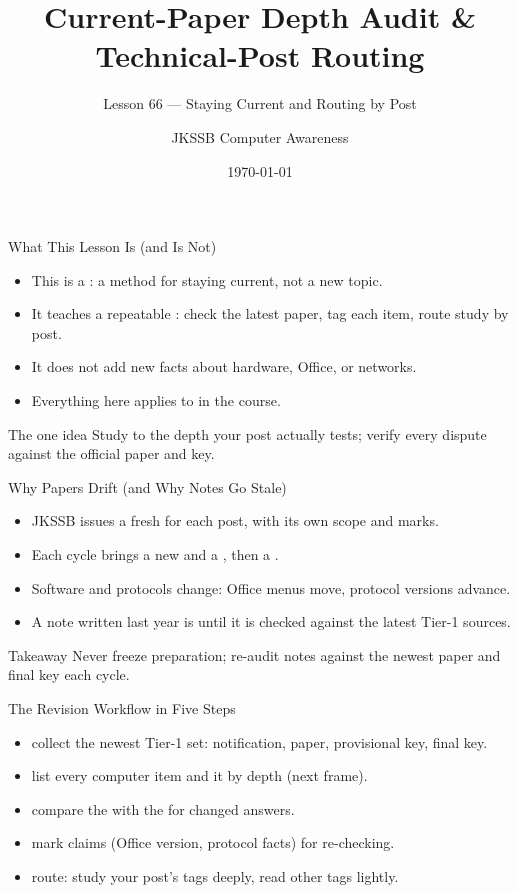 \documentclass[aspectratio=169]{beamer}
\title{Current-Paper Depth Audit \& Technical-Post Routing}
\subtitle{Lesson 66 --- Staying Current and Routing by Post}
\author{JKSSB Computer Awareness}
\date{\today}
\begin{document}
\frame{\titlepage}

\begin{frame}{What This Lesson Is (and Is Not)}
  \begin{itemize}
    \item This is a : a method for staying current, not a new topic.
    \item It teaches a repeatable : check the latest paper, tag each item, route study by post.
    \item It does not add new facts about hardware, Office, or networks.
    \item Everything here applies to  in the course.
  \end{itemize}
  \begin{block}{The one idea}
    Study to the depth your post actually tests; verify every dispute against the official paper and key.
  \end{block}
\end{frame}

\begin{frame}{Why Papers Drift (and Why Notes Go Stale)}
  \begin{itemize}
    \item JKSSB issues a fresh  for each post, with its own scope and marks.
    \item Each cycle brings a new  and a , then a .
    \item Software and protocols change: Office menus move, protocol versions advance.
    \item A note written last year is  until it is checked against the latest Tier-1 sources.
  \end{itemize}
  \begin{alertblock}{Takeaway}
    Never freeze preparation; re-audit notes against the newest paper and final key each cycle.
  \end{alertblock}
\end{frame}

\begin{frame}{The Revision Workflow in Five Steps}
  \begin{itemize}
    \item {} collect the newest Tier-1 set: notification, paper, provisional key, final key.
    \item {} list every computer item and  it by depth (next frame).
    \item {} compare the  with the  for changed answers.
    \item {} mark  claims (Office version, protocol facts) for re-checking.
    \item {} route: study your post's tags deeply, read other tags lightly.
  \end{itemize}
\end{frame}
\end{document}
